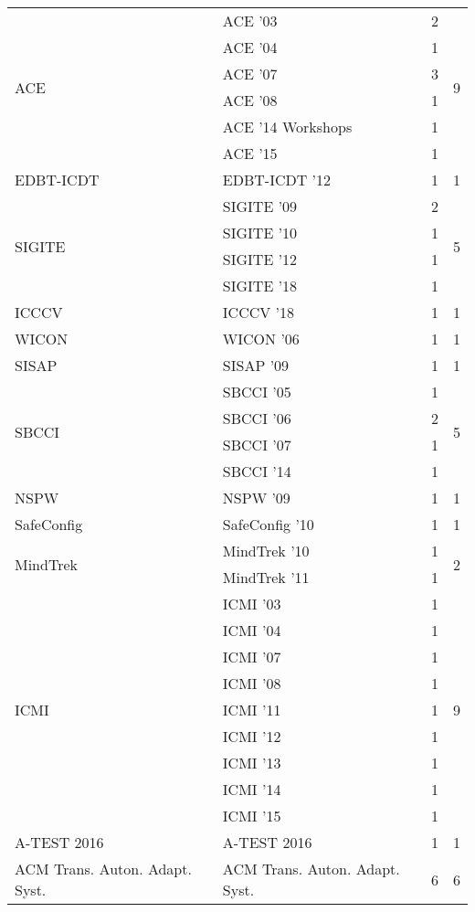 \begin{table*}[t]
\begin{tabular}{llrr}
\multirow{6}{*}{ACE } & ACE '03 & 2 & \multirow{6}{*}{9}\\
& ACE '04 & 1 &\\
& ACE '07 & 3 &\\
& ACE '08 & 1 &\\
& ACE '14 Workshops & 1 &\\
& ACE '15 & 1 &\\
\multirow{1}{*}{EDBT-ICDT } & EDBT-ICDT '12 & 1 & \multirow{1}{*}{1}\\
\multirow{4}{*}{SIGITE } & SIGITE '09 & 2 & \multirow{4}{*}{5}\\
& SIGITE '10 & 1 &\\
& SIGITE '12 & 1 &\\
& SIGITE '18 & 1 &\\
\multirow{1}{*}{ICCCV } & ICCCV '18 & 1 & \multirow{1}{*}{1}\\
\multirow{1}{*}{WICON } & WICON '06 & 1 & \multirow{1}{*}{1}\\
\multirow{1}{*}{SISAP } & SISAP '09 & 1 & \multirow{1}{*}{1}\\
\multirow{4}{*}{SBCCI } & SBCCI '05 & 1 & \multirow{4}{*}{5}\\
& SBCCI '06 & 2 &\\
& SBCCI '07 & 1 &\\
& SBCCI '14 & 1 &\\
\multirow{1}{*}{NSPW } & NSPW '09 & 1 & \multirow{1}{*}{1}\\
\multirow{1}{*}{SafeConfig } & SafeConfig '10 & 1 & \multirow{1}{*}{1}\\
\multirow{2}{*}{MindTrek } & MindTrek '10 & 1 & \multirow{2}{*}{2}\\
& MindTrek '11 & 1 &\\
\multirow{9}{*}{ICMI } & ICMI '03 & 1 & \multirow{9}{*}{9}\\
& ICMI '04 & 1 &\\
& ICMI '07 & 1 &\\
& ICMI '08 & 1 &\\
& ICMI '11 & 1 &\\
& ICMI '12 & 1 &\\
& ICMI '13 & 1 &\\
& ICMI '14 & 1 &\\
& ICMI '15 & 1 &\\
\multirow{1}{*}{A-TEST 2016} & A-TEST 2016 & 1 & \multirow{1}{*}{1}\\
\multirow{1}{*}{ACM Trans. Auton. Adapt. Syst.} & ACM Trans. Auton. Adapt. Syst. & 6 & \multirow{1}{*}{6}\\

\end{tabular}
\end{table*}
